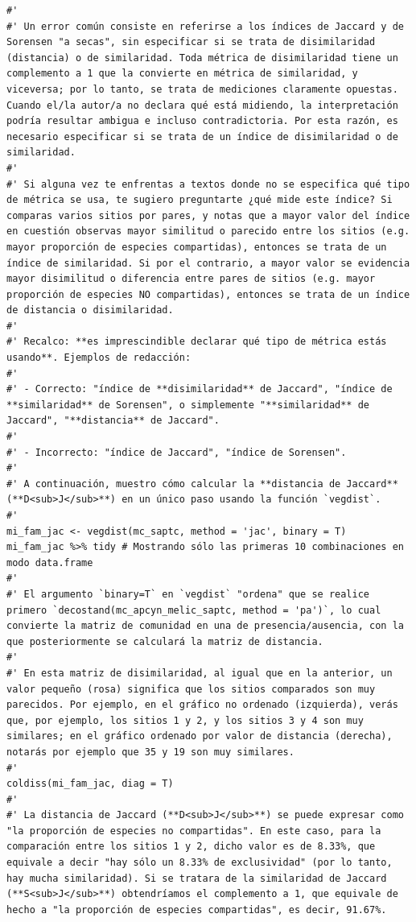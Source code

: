 \documentclass[11pt,]{article}
\begin{document}
\begin{verbatim}
#' 
#' Un error común consiste en referirse a los índices de Jaccard y de Sorensen "a secas", sin especificar si se trata de disimilaridad (distancia) o de similaridad. Toda métrica de disimilaridad tiene un complemento a 1 que la convierte en métrica de similaridad, y viceversa; por lo tanto, se trata de mediciones claramente opuestas. Cuando el/la autor/a no declara qué está midiendo, la interpretación podría resultar ambigua e incluso contradictoria. Por esta razón, es necesario especificar si se trata de un índice de disimilaridad o de similaridad.
#' 
#' Si alguna vez te enfrentas a textos donde no se especifica qué tipo de métrica se usa, te sugiero preguntarte ¿qué mide este índice? Si comparas varios sitios por pares, y notas que a mayor valor del índice en cuestión observas mayor similitud o parecido entre los sitios (e.g. mayor proporción de especies compartidas), entonces se trata de un índice de similaridad. Si por el contrario, a mayor valor se evidencia mayor disimilitud o diferencia entre pares de sitios (e.g. mayor proporción de especies NO compartidas), entonces se trata de un índice de distancia o disimilaridad.
#' 
#' Recalco: **es imprescindible declarar qué tipo de métrica estás usando**. Ejemplos de redacción:
#' 
#' - Correcto: "índice de **disimilaridad** de Jaccard", "índice de **similaridad** de Sorensen", o simplemente "**similaridad** de Jaccard", "**distancia** de Jaccard".
#' 
#' - Incorrecto: "índice de Jaccard", "índice de Sorensen".
#' 
#' A continuación, muestro cómo calcular la **distancia de Jaccard** (**D<sub>J</sub>**) en un único paso usando la función `vegdist`.
#' 
mi_fam_jac <- vegdist(mc_saptc, method = 'jac', binary = T)
mi_fam_jac %>% tidy # Mostrando sólo las primeras 10 combinaciones en modo data.frame
#' 
#' El argumento `binary=T` en `vegdist` "ordena" que se realice primero `decostand(mc_apcyn_melic_saptc, method = 'pa')`, lo cual convierte la matriz de comunidad en una de presencia/ausencia, con la que posteriormente se calculará la matriz de distancia.
#' 
#' En esta matriz de disimilaridad, al igual que en la anterior, un valor pequeño (rosa) significa que los sitios comparados son muy parecidos. Por ejemplo, en el gráfico no ordenado (izquierda), verás que, por ejemplo, los sitios 1 y 2, y los sitios 3 y 4 son muy similares; en el gráfico ordenado por valor de distancia (derecha), notarás por ejemplo que 35 y 19 son muy similares.
#'  
coldiss(mi_fam_jac, diag = T)
#' 
#' La distancia de Jaccard (**D<sub>J</sub>**) se puede expresar como "la proporción de especies no compartidas". En este caso, para la comparación entre los sitios 1 y 2, dicho valor es de 8.33%, que equivale a decir "hay sólo un 8.33% de exclusividad" (por lo tanto, hay mucha similaridad). Si se tratara de la similaridad de Jaccard (**S<sub>J</sub>**) obtendríamos el complemento a 1, que equivale de hecho a "la proporción de especies compartidas", es decir, 91.67%.

\end{verbatim}
\end{document}
